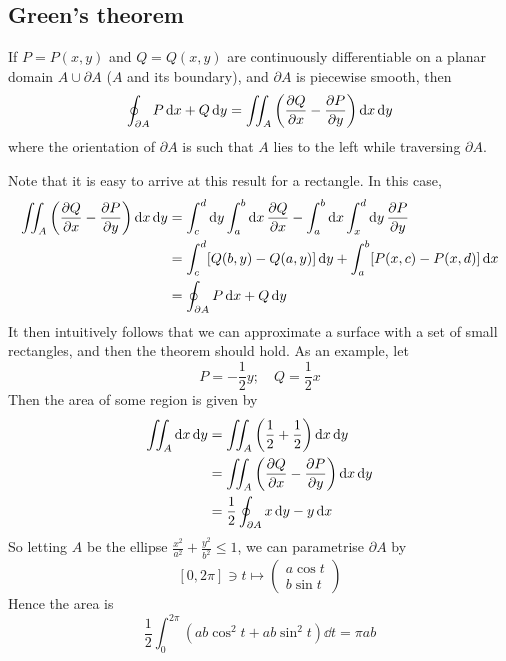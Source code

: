\subsection{Green's theorem}
\begin{proposition}
	If \(P = P(x, y)\) and \(Q = Q(x, y)\) are continuously differentiable on a planar domain \(A \cup \partial A\) (\(A\) and its boundary), and \(\partial A\) is piecewise smooth, then
	\[
		\oint_{\partial A} P \dd{x} + Q \dd{y} = \iint_{A} \left( \pdv{Q}{x} - \pdv{P}{y} \right) \dd{x}\dd{y}
	\]
	where the orientation of \(\partial A\) is such that \(A\) lies to the left while traversing \(\partial A\).
\end{proposition}
Note that it is easy to arrive at this result for a rectangle.
In this case,
\begin{align*}
	\iint_{A} \left( \pdv{Q}{x} - \pdv{P}{y} \right) \dd{x}\dd{y} & = \int_c^d \dd{y} \int_a^b \dd{x} \pdv{Q}{x} - \int_a^b \dd{x} \int_x^d \dd{y} \pdv{P}{y} \\
	                                                              & = \int_c^d [Q(b, y) - Q(a, y)] \dd{y} + \int_a^b [P(x, c) - P(x, d)] \dd{x}               \\
	                                                              & = \oint_{\partial A} P \dd{x} + Q \dd{y}
\end{align*}
It then intuitively follows that we can approximate a surface with a set of small rectangles, and then the theorem should hold.
As an example, let
\[
	P = -\frac{1}{2}y;\quad Q = \frac{1}{2}x
\]
Then the area of some region is given by
\begin{align*}
	\iint_A \dd{x}\dd{y} & = \iint_A \left( \frac{1}{2} + \frac{1}{2} \right) \dd{x}\dd{y} \\
	                     & = \iint_A \left( \pdv{Q}{x} - \pdv{P}{y} \right) \dd{x}\dd{y}   \\
	                     & = \frac{1}{2}\oint_{\partial A} x\dd{y} - y\dd{x}
\end{align*}
So letting \(A\) be the ellipse \(\frac{x^2}{a^2} + \frac{y^2}{b^2} \leq 1\), we can parametrise \(\partial A\) by
\[
	[0, 2 \pi] \ni t \mapsto \begin{pmatrix}
		a \cos t \\ b \sin t
	\end{pmatrix}
\]
Hence the area is
\[
	\frac{1}{2}\int_0^{2\pi} \left( ab\cos^2 t + ab\sin^2 t \right) \dd{t} = \pi ab
\]

